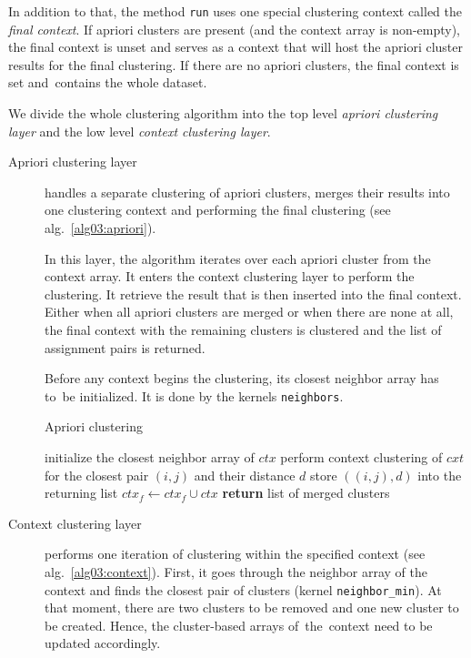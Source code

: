 In addition to that, the method \texttt{run} uses one special clustering context called the \emph{final context}. If apriori clusters are present (and the context array is non-empty), the final context is unset and serves as a context that will host the apriori cluster results for the final clustering. If there are no apriori clusters, the final context is set and~contains the whole dataset.

We divide the whole clustering algorithm into the top level \emph{apriori clustering layer} and the low level \emph{context clustering layer}.

\begin{description}
	\item[Apriori clustering layer] handles a separate clustering of apriori clusters, mer\-ges their results into one clustering context and performing the final clustering (see alg.~\ref{alg03:apriori}).
	
	In this layer, the algorithm iterates over each apriori cluster from the context array. It enters the context clustering layer to perform the clustering. It retrieve the result that is then inserted into the final context. Either when all apriori clusters are merged or when there are none at all, the final context with the remaining clusters is clustered and the list of assignment pairs is returned.
	
	Before any context begins the clustering, its closest neighbor array has to~be initialized. It is done by the kernels \texttt{neighbors}.
	
	
	\begin{algorithm}
		\caption{Apriori clustering}
		\label{alg03:apriori}
		\begin{algorithmic}[1]
			 
			\State initialize the closest neighbor array of $ctx$ 
			\State perform context clustering of $cxt$ for the closest pair $(i,j)$ and their distance $d$
			\State store $((i,j),d)$ into the returning list
			\EndWhile
			\State $ctx_f \gets ctx_f \cup ctx$ 
			\EndFor
			\State \textbf{return} list of merged clusters
			\EndProcedure
		\end{algorithmic}
	\end{algorithm}

	\item[Context clustering layer] performs one iteration of clustering within the specified context (see alg.~\ref{alg03:context}). First, it goes through the neighbor array of the context and finds the closest pair of clusters (kernel \texttt{neighbor\_min}). At that moment, there are two clusters to be removed and one new cluster to be created. Hence, the cluster-based arrays of~the~context need to be updated accordingly.
	

\end{description}
